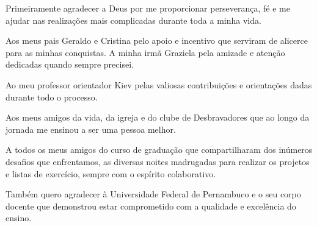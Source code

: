 Primeiramente agradecer a Deus por me proporcionar perseverança, fé e me ajudar nas realizações mais complicadas durante toda a minha vida.

Aos meus pais Geraldo e Cristina pelo apoio e incentivo que serviram de alicerce para as minhas conquistas. A minha irmã Graziela pela amizade e atenção dedicadas quando sempre precisei.

Ao meu professor orientador Kiev pelas valiosas contribuições e orientações dadas durante todo o processo.

Aos meus amigos da vida, da igreja e do clube de Desbravadores que ao longo da jornada me ensinou a ser uma pessoa melhor.

A todos os meus amigos do curso de graduação que compartilharam dos inúmeros desafios que enfrentamos, as diversas noites madrugadas para realizar os projetos e listas de exercício, sempre com o espírito colaborativo.

Também quero agradecer à Universidade Federal de Pernambuco e o seu corpo docente que demonstrou estar comprometido com a qualidade e excelência do ensino.